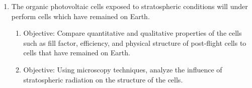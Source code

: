 \begin{enumerate}
\item The organic photovoltaic cells exposed to stratospheric conditions will under perform cells which have remained on Earth.
  \begin{enumerate}
  \item Objective: Compare quantitative and qualitative properties of the cells such as fill factor, efficiency, and physical structure of post-flight cells to cells that have remained on Earth.
  \item Objective: Using microscopy techniques, analyze the influence of stratospheric radiation on the structure of the cells.
  \end{enumerate}
\end{enumerate}
  
\vspace*{-0.5cm}